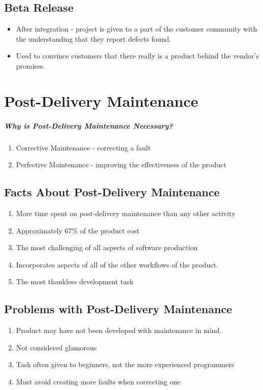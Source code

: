 \documentclass{report}
\begin{document}
		\section{Beta Release}
			\begin{itemize}
		    	\item After integration - project is given to a part of the customer community with the understanding that they report defects found.
		    	\item Used to convince customers that there really is a product behind the vendor's promises.
		    \end{itemize}
	\chapter{Post-Delivery Maintenance}
		\paragraph{Why is Post-Delivery Maintenance Necessary?}
			\begin{enumerate}
				\item Corrective Maintenance - correcting a fault
				\item Perfective Maintenance - improving the effectiveness of the product
			\end{enumerate}
		\section{Facts About Post-Delivery Maintenance} 
			\begin{enumerate}
				\item More time spent on post-delivery maintenance than any other activity
				\item Approximately 67\% of the product cost
				\item The most challenging of all aspects of software production
				\item Incorporates aspects of all of the other workflows of the product.
				\item The most thankless development task
			\end{enumerate}
		\section{Problems with Post-Delivery Maintenance}
			\begin{enumerate}
				\item Product may have not been developed with maintenance in mind.
				\item Not considered glamorous
				\item Task often given to beginners, not the more experienced programmers
				\item Must avoid creating more faults when correcting one
			\end{enumerate}
\end{document}
